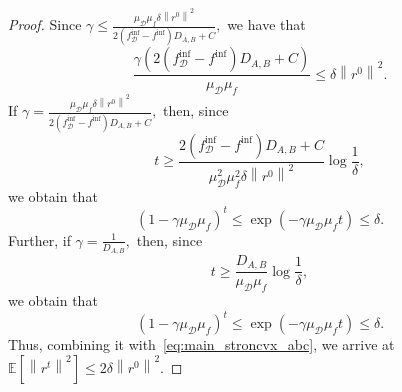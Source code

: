 \documentclass{article}
\newcommand{\bb}{\mathbb}
\newcommand{\Exp}[1]{{\bb E}\left[#1\right]}
\theoremstyle{plain}
\newcommand{\tf}{f_{\mathcal{D}}}
\theoremstyle{plain}
\theoremstyle{definition}
\theoremstyle{remark}
\begin{document}
\begin{proof}
	Since $\gamma\leq \frac{\mu_{\mathcal{D}}\mu_f\delta\left\|r^0\right\|^2}{2\left(\tf^{\inf} - f^{\inf}\right)D_{A,B}+C},$
	we have that
	\begin{equation*}
		\frac{\gamma\left(2\left(\tf^{\inf} - f^{\inf}\right)D_{A,B}+C\right)}{\mu_{\mathcal{D}}\mu_f} \leq\delta\left\|r^0\right\|^2.
	\end{equation*}
	If $\gamma= \frac{\mu_{\mathcal{D}}\mu_f\delta\left\|r^0\right\|^2}{2\left(\tf^{\inf} - f^{\inf}\right)D_{A,B}+C},$ then, since
	\begin{equation*}
		t\geq \frac{2\left(\tf^{\inf} - f^{\inf}\right)D_{A,B}+C}{\mu_{\mathcal{D}}^2\mu_f^2\delta\left\|r^0\right\|^2}\log\frac{1}{\delta},
	\end{equation*}
	we obtain that
	\begin{equation*}
		\left(1-\gamma\mu_{\mathcal{D}}\mu_f\right)^t\leq\exp\left(-\gamma\mu_{\mathcal{D}}\mu_ft\right)\leq\delta.
	\end{equation*}
	Further, if $\gamma=\frac{1}{D_{A,B}},$ then, since
	\begin{equation*}
		t\geq \frac{D_{A,B}}{\mu_{\mathcal{D}}\mu_f}\log\frac{1}{\delta},
	\end{equation*}
	we obtain that
	\begin{equation*}
		\left(1-\gamma\mu_{\mathcal{D}}\mu_f\right)^t\leq\exp\left(-\gamma\mu_{\mathcal{D}}\mu_ft\right)\leq\delta.
	\end{equation*}
	Thus, combining it with~\eqref{eq:main_stroncvx_abc}, we arrive at $\Exp{\left\|r^{t}\right\|^2} \leq 2\delta\left\|r^0\right\|^2.$
\end{proof}
\end{document}
